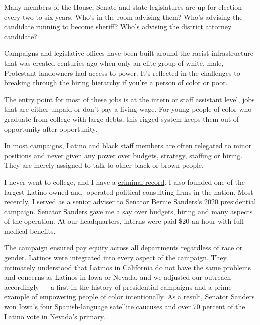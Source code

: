 Many members of the House, Senate and state legislatures are up for
election every two to six years. Who's in the room advising them? Who's
advising the candidate running to become sheriff? Who's advising the
district attorney candidate?

Campaigns and legislative offices have been built around the racist
infrastructure that was created centuries ago when only an elite group
of white, male, Protestant landowners had access to power. It's
reflected in the challenges to breaking through the hiring hierarchy if
you're a person of color or poor.

The entry point for most of these jobs is at the intern or staff
assistant level, jobs that are either unpaid or don't pay a living wage.
For young people of color who graduate from college with large debts,
this rigged system keeps them out of opportunity after opportunity.

In most campaigns, Latino and black staff members are often relegated to
minor positions and never given any power over budgets, strategy,
staffing or hiring. They are merely assigned to talk to other black or
brown people.

I never went to college, and I have a
\href{https://www.dol.gov/olms/regs/compliance/enforce_2013.htm\#:~:text=On\%20July\%2030\%2C\%202013\%2C\%20in,pay\%20a\%20fine\%20of\%20\%242\%2C000.}{criminal
record}. I also founded one of the largest Latino-owned and -operated
political consulting firms in the nation. Most recently, I served as a
senior adviser to Senator Bernie Sanders's 2020 presidential campaign.
Senator Sanders gave me a say over budgets, hiring and many aspects of
the operation. At our headquarters, interns were paid \$20 an hour with
full medical benefits.

The campaign ensured pay equity across all departments regardless of
race or gender. Latinos were integrated into every aspect of the
campaign. They intimately understood that Latinos in California do not
have the same problems and concerns as Latinos in Iowa or Nevada, and we
adjusted our outreach accordingly --- a first in the history of
presidential campaigns and a prime example of empowering people of color
intentionally. As a result, Senator Sanders won Iowa's four
\href{https://thehill.com/latino/482030-analysis-sanders-ran-the-table-with-latinos-in-iowa}{Spanish-language
satellite caucuses} and
\href{https://www.dailykos.com/stories/2020/2/23/1921481/-UCLA-data-on-Nevada-more-than-70-of-Latinos-voted-for-Bernie-Sanders}{over
70 percent} of the Latino vote in Nevada's primary.


